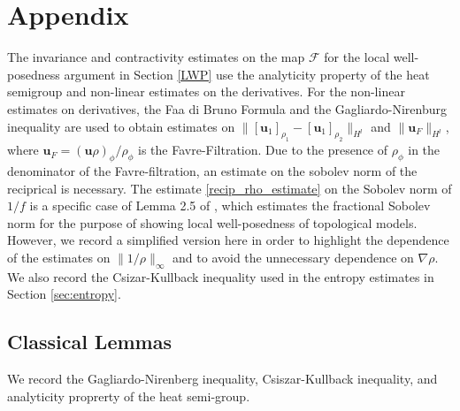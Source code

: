 \documentclass[11pt,letterpaper]{amsart}
\theoremstyle{plain}
\theoremstyle{definition}
\theoremstyle{remark}
\def\u{\textbf{u}}
\def \st {\mathrm{s}}
\begin{document}
\section{Appendix}
\label{appendix}
The invariance and contractivity estimates on the map $\mathcal{F}$ for the local 
well-posedness argument in Section \ref{LWP} 
use the analyticity property of the heat semigroup and non-linear estimates on the derivatives.
For the non-linear estimates on derivatives, the Faa di Bruno Formula and the Gagliardo-Nirenburg inequality are used 
to obtain estimates on $\|[\u_1]_{\rho_1} - [\u_1]_{\rho_2} \|_{H^l}$ and $\| \u_F \|_{H^l}$, 
where $\u_F = (\u \rho)_{\phi} / \rho_{\phi}$ is the Favre-Filtration.  
Due to the presence of $\rho_{\phi}$ in the denominator of the Favre-filtration, 
an estimate on the sobolev norm of the reciprical is necessary.  
The estimate \eqref{recip_rho_estimate} on the Sobolev norm of $1/f$ 
is a specific case of Lemma 2.5 of \cite{lear_reynolds_shvydkoy2020local}, which 
estimates the fractional Sobolev norm for the purpose of showing local well-posedness of topological models. 
However, we record a simplified version here in order 
to highlight the dependence of the estimates on $\|1/\rho\|_{\infty}$ and to 
avoid the unnecessary dependence on $\nabla \rho$.  
We also record the Csizar-Kullback inequality used in the entropy estimates 
in Section \ref{sec:entropy}. 


\subsection{Classical Lemmas} 
We record the Gagliardo-Nirenberg inequality, Csiszar-Kullback inequality, and analyticity proprerty of 
the heat semi-group.
\end{document}
